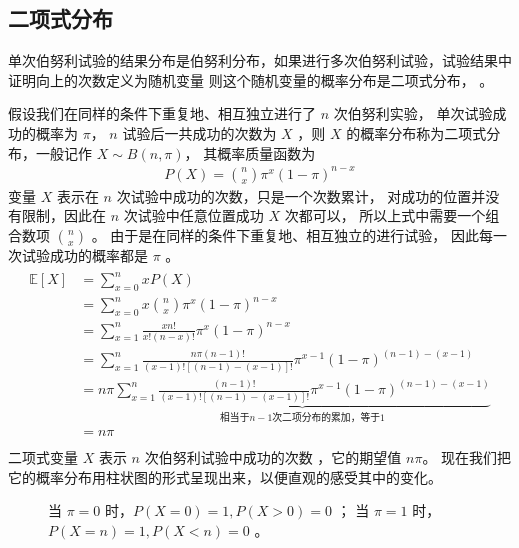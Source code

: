 \documentclass[letterpaper,10pt,english]{sphinxmanual}
\begin{document}
\subsection{二项式分布}
\label{\detokenize{_u6982_u7387_u57fa_u7840/content:id19}}
单次伯努利试验的结果分布是伯努利分布，如果进行多次伯努利试验，试验结果中证明向上的次数定义为随机变量
则这个随机变量的概率分布是二项式分布，
。

假设我们在同样的条件下重复地、相互独立进行了 \(n\) 次伯努利实验，
单次试验成功的概率为 \(\pi\)，
\(n\) 试验后一共成功的次数为 \(X\)
，则 \(X\) 的概率分布称为二项式分布，一般记作 \(X \sim B(n,\pi)\)，
其概率质量函数为
\begin{equation}\label{equation:概率基础/content:概率基础/content:59}
\begin{split}P(X) = \binom{n}{x} \pi^x (1-\pi)^{n-x}\end{split}
\end{equation}
变量 \(X\) 表示在 \(n\) 次试验中成功的次数，只是一个次数累计，
对成功的位置并没有限制，因此在 \(n\) 次试验中任意位置成功 \(X\) 次都可以，
所以上式中需要一个组合数项 \(\binom{n}{x}\) 。
由于是在同样的条件下重复地、相互独立的进行试验，
因此每一次试验成功的概率都是 \(\pi\) 。
\begin{align}\label{equation:概率基础/content:概率基础/content:60}\!\begin{aligned}
\mathbb{E}[X] &= \sum_{x=0}^{n}  x P(X)\\
&= \sum_{x=0}^{n}  x \binom{n}{x} \pi^x (1-\pi)^{n-x}\\
&= \sum_{x=1}^{n}   \frac{xn!}{x!(n-x)!} \pi^x (1-\pi)^{n-x}\\
&= \sum_{x=1}^{n}   \frac{n \pi (n-1)!}{(x-1)![(n-1)-(x-1)]!} \pi^{x-1} (1-\pi)^{(n-1)-(x-1)}\\
&= n \pi   \underbrace{\sum_{x=1}^{n} \frac{ (n-1)!}{(x-1)![(n-1)-(x-1)]!} \pi^{x-1} (1-\pi)^{(n-1)-(x-1)}}_{
\text{相当于}n-1 \text{次二项分布的累加，等于}1}\\
&= n \pi\\
\end{aligned}\end{align}
二项式变量 \(X\) 表示 \(n\) 次伯努利试验中成功的次数
，它的期望值 \(n \pi\)。
现在我们把它的概率分布用柱状图的形式呈现出来，以便直观的感受其中的变化。

\begin{figure}[htbp]
\centering
\capstart

\noindent{}
\caption{当 \(\pi=0\) 时，\(P(X=0)=1,P(X>0)=0\) ；
当 \(\pi=1\) 时，\(P(X=n)=1,P(X<n)=0\) 。}\label{\detokenize{_u6982_u7387_u57fa_u7840/content:id25}}\label{\detokenize{_u6982_u7387_u57fa_u7840/content:fg-probability-002}}\end{figure}
\end{document}

